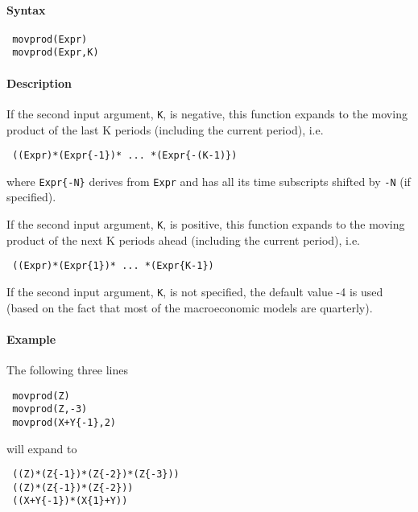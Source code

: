 


	\paragraph{Syntax}
 
 \begin{verbatim}
 movprod(Expr)
 movprod(Expr,K)
 \end{verbatim}
 
 \paragraph{Description}
 
 If the second input argument, \texttt{K}, is negative, this function
 expands to the moving product of the last K periods (including the
 current period), i.e.
 
 \begin{verbatim}
 ((Expr)*(Expr{-1})* ... *(Expr{-(K-1)})
 \end{verbatim}
 
 where \texttt{Expr\{-N\}} derives from \texttt{Expr} and has all its
 time subscripts shifted by \texttt{-N} (if specified).
 
 If the second input argument, \texttt{K}, is positive, this function
 expands to the moving product of the next K periods ahead (including the
 current period), i.e.
 
 \begin{verbatim}
 ((Expr)*(Expr{1})* ... *(Expr{K-1})
 \end{verbatim}
 
 If the second input argument, \texttt{K}, is not specified, the default
 value -4 is used (based on the fact that most of the macroeconomic
 models are quarterly).
 
 \paragraph{Example}
 
 The following three lines
 
 \begin{verbatim}
 movprod(Z)
 movprod(Z,-3)
 movprod(X+Y{-1},2)
 \end{verbatim}
 
 will expand to
 
 \begin{verbatim}
 ((Z)*(Z{-1})*(Z{-2})*(Z{-3}))
 ((Z)*(Z{-1})*(Z{-2}))
 ((X+Y{-1})*(X{1}+Y))
 \end{verbatim}


